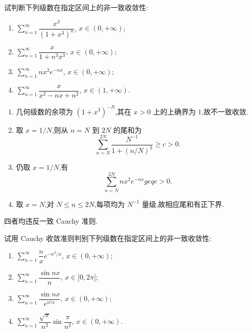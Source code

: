 \begin{example}
    试判断下列级数在指定区间上的非一致收敛性:
    \begin{enumerate}
        \item $\displaystyle\sum\limits_{n=1}^{\infty}\dfrac{x^3}{(1+x^3)^n}$, $x\in(0,+\infty)$;
        \item $\displaystyle\sum\limits_{n=1}^{\infty}\dfrac{x}{1+n^3x^3}$, $x\in(0,+\infty)$;
        \item $\displaystyle\sum\limits_{n=1}^{\infty}nx^2e^{-nx}$, $x\in(0,+\infty)$;
        \item $\displaystyle\sum\limits_{n=1}^{\infty}\dfrac{x}{x^2-nx+n^2}$, $x\in(1,+\infty)$.
    \end{enumerate}
\end{example}
\exampleblank

\begin{solution}
    \begin{enumerate}
        \item 几何级数的余项为 $(1+x^3)^{-N}$,其在 $x>0$ 上的上确界为 $1$,故不一致收敛.
        \item 取 $x=1/N$,则从 $n=N$ 到 $2N$ 的尾和为
              \[
                  \sum\limits_{n=N}^{2N}\dfrac{N^{-1}}{1+(n/N)^3}\geq c>0.
              \]
        \item 仍取 $x=1/N$,有
              \[
                  \sum\limits_{n=N}^{2N}nx^2e^{-nx}geq c>0.
              \]
        \item 取 $x=N$,对 $N\leq n\leq2N$,每项均为 $N^{-1}$ 量级,故相应尾和有正下界.
    \end{enumerate}
    四者均违反一致 Cauchy 准则.
\end{solution}

\begin{example}
    试用 Cauchy 收敛准则判别下列级数在指定区间上的非一致收敛性:
    \begin{enumerate}
        \item $\displaystyle\sum\limits_{n=1}^{\infty}\dfrac{n}{x}e^{-n^2/x}$, $x\in(0,+\infty)$;
        \item $\displaystyle\sum\limits_{n=1}^{\infty}\dfrac{\sin nx}{n}$, $x\in\lbrack 0,2\pi\rbrack$;
        \item $\displaystyle\sum\limits_{n=1}^{\infty}\dfrac{\sin nx}{e^{n^2x}}$, $x\in(0,+\infty)$;
        \item $\displaystyle\sum\limits_{n=1}^{\infty}\dfrac{\sqrt{\pi}}{n^2}\sin\dfrac{\pi}{n^2}$, $x\in(0,+\infty)$.
    \end{enumerate}
\end{example}
\exampleblank

